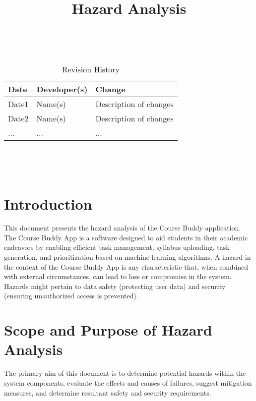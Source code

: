\documentclass{article}
\title{Hazard Analysis\\\progname}
\author{\authname}
\date{}
\begin{document}
\maketitle
\thispagestyle{empty}

~\newpage


\begin{table}[hp]
\caption{Revision History} \label{TblRevisionHistory}
\begin{tabularx}{\textwidth}{llX}
\toprule
\textbf{Date} & \textbf{Developer(s)} & \textbf{Change}\\
\midrule
Date1 & Name(s) & Description of changes\\
Date2 & Name(s) & Description of changes\\
... & ... & ...\\
\bottomrule
\end{tabularx}
\end{table}

~\newpage

\tableofcontents

~\newpage



\section{Introduction}
This document presents the hazard analysis of the Course Buddy application. The Course Buddy App is a software designed to aid students in their academic endeavors by enabling efficient task management, syllabus uploading, task generation, and prioritization based on machine learning algorithms.
A hazard in the context of the Course Buddy App is any characteristic that, when combined with external circumstances, can lead to loss or compromise in the system. Hazards might pertain to data safety (protecting user data) and security (ensuring unauthorized access is prevented).

\section{Scope and Purpose of Hazard Analysis}
The primary aim of this document is to determine potential hazards within the system components, evaluate the effects and causes of failures, suggest mitigation measures, and determine resultant safety and security requirements.
\end{document}

